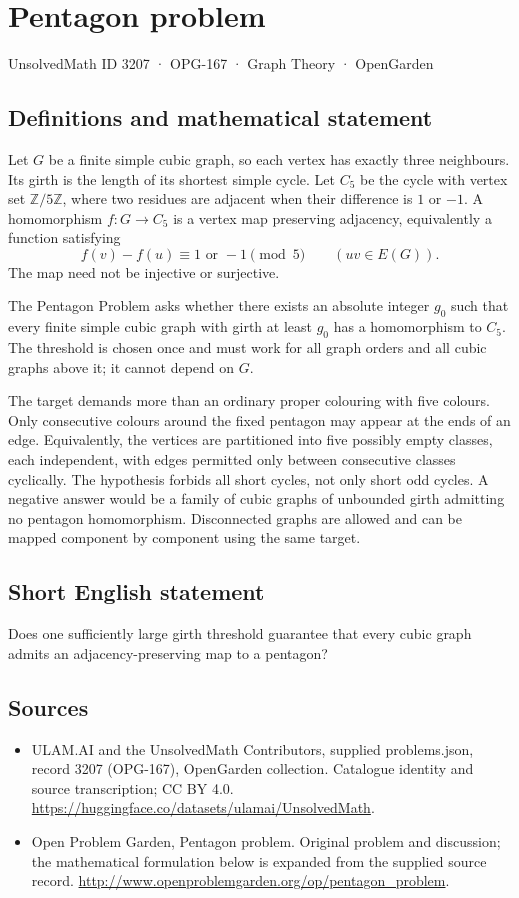 \documentclass[11pt,a4paper]{article}
\begin{document}
\section*{Pentagon problem}\label{3207}
{\small UnsolvedMath ID 3207 · OPG-167 · Graph Theory · OpenGarden}
\subsection{Definitions and mathematical statement}
Let $G$ be a finite simple cubic graph, so each
vertex has exactly three neighbours. Its girth
is the length of its shortest simple cycle.
Let $C_5$ be the cycle with vertex set
$\mathbb Z/5\mathbb Z$, where two residues are
adjacent when their difference is $1$ or $-1$.
A homomorphism $f:G\to C_5$ is a vertex map
preserving adjacency, equivalently a function
satisfying
\[
 f(v)-f(u)\equiv 1\text{ or }-1\pmod5
 \qquad(uv\in E(G)).
\]
The map need not be injective or surjective.

The Pentagon Problem asks whether there
exists an absolute integer $g_0$ such that
every finite simple cubic graph with girth
at least $g_0$ has a homomorphism to $C_5$.
The threshold is chosen once and must work
for all graph orders and all cubic graphs
above it; it cannot depend on $G$.

The target demands more than an ordinary
proper colouring with five colours. Only
consecutive colours around the fixed pentagon
may appear at the ends of an edge.
Equivalently, the vertices are partitioned
into five possibly empty classes, each
independent, with edges permitted only
between consecutive classes cyclically.
The hypothesis forbids all short cycles,
not only short odd cycles. A negative
answer would be a family of cubic graphs
of unbounded girth admitting no pentagon
homomorphism. Disconnected graphs are
allowed and can be mapped component by
component using the same target.
\subsection{Short English statement}
Does one sufficiently large girth threshold guarantee that every cubic graph admits an adjacency-preserving map to a pentagon?
\subsection{Sources}
\begin{itemize}
\item[S1] ULAM.AI and the UnsolvedMath Contributors, supplied problems.json, record 3207 (OPG-167), OpenGarden collection. Catalogue identity and source transcription; CC BY 4.0.
\url{https://huggingface.co/datasets/ulamai/UnsolvedMath}.
\item[S2] Open Problem Garden, Pentagon problem. Original problem and discussion; the mathematical formulation below is expanded from the supplied source record.
\url{http://www.openproblemgarden.org/op/pentagon_problem}.
\end{itemize}
\end{document}
